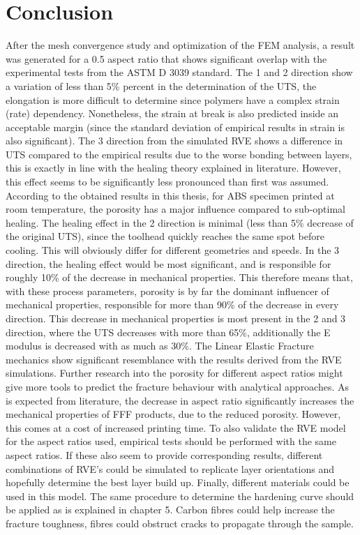 \section{Conclusion}
After the mesh convergence study and optimization of the FEM analysis, a result was generated for a 0.5 aspect ratio that shows significant overlap with the experimental tests from the ASTM D 3039 standard. The 1 and 2 direction show a variation of less than 5\% percent in the determination of the UTS, the elongation is more difficult to determine since polymers have a complex strain (rate) dependency. Nonetheless, the strain at break is also predicted inside an acceptable margin (since the standard deviation of empirical results in strain is also significant). The 3 direction from the simulated RVE shows a difference in UTS compared to the empirical results due to the worse bonding between layers, this is exactly in line with the healing theory explained in literature. However, this effect seems to be significantly less pronounced than first was assumed. According to the obtained results in this thesis, for ABS specimen printed at room temperature, the porosity has a major influence compared to sub-optimal healing.  The healing effect in the 2 direction is minimal (less than 5\% decrease of the original UTS), since the toolhead quickly reaches the same spot before cooling. This will obviously differ for different geometries and speeds. In the 3 direction, the healing effect would be most significant, and is responsible for roughly 10\% of the decrease in mechanical properties. This therefore means that, with these process parameters, porosity is by far the dominant influencer of mechanical properties, responsible for more than 90\% of the decrease in every direction. This decrease in mechanical properties is most present in the 2 and 3 direction, where the UTS decreases with more than 65\%, additionally the E modulus is decreased with as much as 30\%. 
The Linear Elastic Fracture mechanics show significant resemblance with the results derived from the RVE simulations. Further research into the porosity for different aspect ratios might give more tools to predict the fracture behaviour with analytical approaches. 
As is expected from literature, the decrease in aspect ratio significantly increases the mechanical properties of FFF products, due to the reduced porosity. However, this comes at a cost of increased printing time.
To also validate the RVE model for the aspect ratios used, empirical tests should be performed with the same aspect ratios. If these also seem to provide corresponding results, different combinations of RVE's could be simulated to replicate layer orientations and hopefully determine the best layer build up. 
Finally, different materials could be used in this model. The same procedure to determine the hardening curve should be applied as is explained in chapter 5. Carbon fibres could help increase the fracture toughness, fibres could obstruct cracks to propagate through the sample.  



